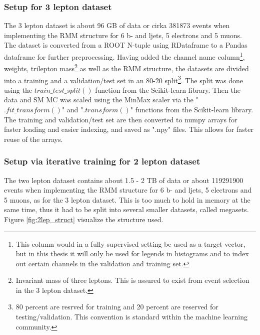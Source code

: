 \subsubsection*{Setup for 3 lepton dataset}
The 3 lepton dataset is about 96 GB of data or cirka 381873 events when implementing the RMM structure for 6 b- and ljets, 5 electrons and 5 muons. The dataset 
is converted from a ROOT N-tuple using RDataframe to a Pandas dataframe\cite{reback2020pandas} for further preprocessing. Having added the channel name column\footnote{This column would in a fully supervised setting be used as a target vector, but in this thesis it will only be used for legends in
histograms and to index out certain channels in the validation and training set. },  weights, 
trilepton mass\footnote{Invariant mass of three leptons. This is assured to exist from event selection in the 3 lepton dataset.} as well as the RMM structure, 
the datasets are divided into 
a training and a validation/test set in an 80-20 split\footnote{80 percent are resrved for training and 20 percent are reserved for testing/validation. 
This convention is standard within the machine learning community.}. The split was done using the $train\_test\_split()$ function from the Scikit-learn library\cite{scikit-learn}.
Then the data and SM MC was scaled using the MinMax scaler via the "$.fit\_transform()$" and "$.transform()$" functions from the 
Scikit-learn library. The training and validation/test set are then converted to numpy arrays\cite{harris2020array} for faster 
loading and easier indexing, and saved as ".npy" files. This allows for faster reuse of the arrays. 

\subsubsection*{Setup via iterative training for 2 lepton dataset}
The two lepton dataset contains about 1.5 - 2 TB of data or about 119291900 events when implementing the RMM structure for 6 
b- and ljets, 5 electrons and 5 muons, as for the 3 lepton dataset. This is too much to hold in memory at the same time, thus it had to 
be split into several smaller datasets, called megasets. Figure \ref{fig:2lep_struct} visualize the structure used. 

